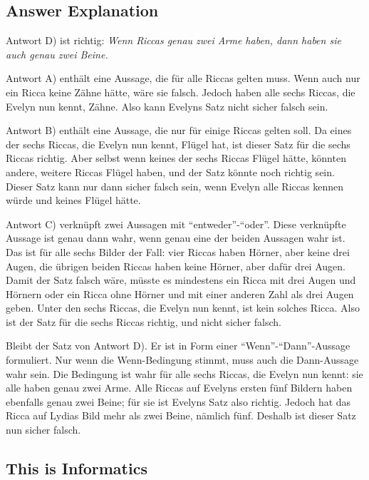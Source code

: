 \documentclass[a4paper,11pt]{report}
\begin{document}
\endgroup

\subsection*{Answer Explanation}

Antwort D) ist richtig: \emph{Wenn Riccas genau zwei Arme haben, dann haben sie auch genau zwei Beine.}

Antwort A) enthält eine Aussage, die für alle Riccas gelten muss. Wenn auch nur ein Ricca keine Zähne hätte, wäre sie falsch. Jedoch haben alle sechs Riccas, die Evelyn nun kennt, Zähne. Also kann Evelyns Satz nicht sicher falsch sein.

Antwort B) enthält eine Aussage, die nur für einige Riccas gelten soll.  Da eines der sechs Riccas, die Evelyn nun kennt, Flügel hat, ist dieser Satz für die sechs Riccas richtig.  Aber selbst wenn keines der sechs Riccas Flügel hätte, könnten andere, weitere Riccas Flügel haben, und der Satz könnte noch richtig sein.  Dieser Satz kann nur dann sicher falsch sein, wenn Evelyn alle Riccas kennen würde und keines Flügel hätte.

Antwort C) verknüpft zwei Aussagen mit \enquote{entweder}-\enquote{oder}. Diese verknüpfte Aussage ist genau dann wahr, wenn genau eine der beiden Aussagen wahr ist. Das ist für alle sechs Bilder der Fall: vier Riccas haben Hörner, aber keine drei Augen, die übrigen beiden Riccas haben keine Hörner, aber dafür drei Augen. Damit der Satz falsch wäre, müsste es mindestens ein Ricca mit drei Augen und Hörnern oder ein Ricca ohne Hörner und mit einer anderen Zahl als drei Augen geben.  Unter den sechs Riccas, die Evelyn nun kennt, ist kein solches Ricca. Also ist der Satz für die sechs Riccas richtig, und nicht sicher falsch.

Bleibt der Satz von Antwort D). Er ist in Form einer \enquote{Wenn}-\enquote{Dann}-Aussage formuliert. Nur wenn die Wenn-Bedingung stimmt, muss auch die Dann-Aussage wahr sein. Die Bedingung ist wahr für alle sechs Riccas, die Evelyn nun kennt: sie alle haben genau zwei Arme. Alle Riccas auf Evelyns ersten fünf Bildern haben ebenfalls genau zwei Beine; für sie ist Evelyns Satz also richtig. Jedoch hat das Ricca auf Lydias Bild mehr als zwei Beine, nämlich fünf. Deshalb ist dieser Satz nun sicher falsch.


\subsection*{This is Informatics}
\end{document}
